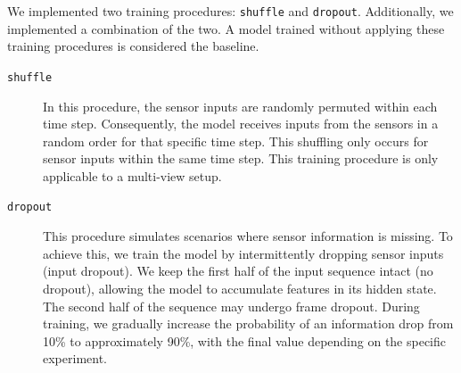 We implemented two training procedures: \texttt{shuffle} and \texttt{dropout}. Additionally, we implemented a combination of the two. A model trained without applying these training procedures is considered the baseline.

\begin{description}
    \item[\texttt{shuffle}] In this procedure, the sensor inputs are randomly permuted within each time step. Consequently, the model receives inputs from the sensors in a random order for that specific time step. This shuffling only occurs for sensor inputs within the same time step. This training procedure is only applicable to a multi-view setup.

    \item[\texttt{dropout}] This procedure simulates scenarios where sensor information is missing. To achieve this, we train the model by intermittently dropping sensor inputs (input dropout). We keep the first half of the input sequence intact (no dropout), allowing the model to accumulate features in its hidden state. The second half of the sequence may undergo frame dropout. During training, we gradually increase the probability of an information drop from 10\% to approximately 90\%, with the final value depending on the specific experiment.
\end{description}





